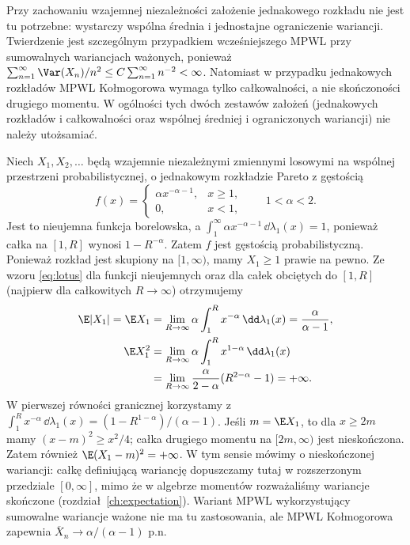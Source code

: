 \begin{uwaga}
Przy zachowaniu wzajemnej niezależności założenie
jednakowego rozkładu nie jest tu potrzebne: wystarczy
wspólna średnia i jednostajne ograniczenie wariancji.
Twierdzenie jest szczególnym przypadkiem wcześniejszego
MPWL przy sumowalnych wariancjach ważonych, ponieważ
$\sum_{n=1}^\infty\Var(X_n)/n^2
\leq C\sum_{n=1}^\infty n^{-2}<\infty$.
Natomiast w przypadku jednakowych rozkładów MPWL
Kołmogorowa wymaga tylko całkowalności, a nie
skończoności drugiego momentu. W ogólności tych dwóch
zestawów założeń (jednakowych rozkładów i całkowalności
oraz wspólnej średniej i ograniczonych wariancji)
nie należy utożsamiać.
\end{uwaga}

\begin{przyklad}
Niech $X_1,X_2,\ldots$ będą wzajemnie niezależnymi
zmiennymi losowymi na wspólnej przestrzeni
probabilistycznej, o jednakowym rozkładzie Pareto
z gęstością
\[
f(x)=
\begin{cases}
\alpha x^{-\alpha-1},&x\geq1,\\
0,&x<1,
\end{cases}
\qquad 1<\alpha<2.
\]
Jest to nieujemna funkcja borelowska, a
$\int_1^\infty\alpha x^{-\alpha-1}\,\dd\lambda_1(x)=1$,
ponieważ całka na $[1,R]$ wynosi $1-R^{-\alpha}$.
Zatem $f$ jest gęstością probabilistyczną.
Ponieważ rozkład jest skupiony na $[1,\infty)$,
mamy $X_1\geq1$ prawie na pewno. Ze wzoru
\eqref{eq:lotus} dla funkcji nieujemnych oraz
dla całek obciętych do $[1,R]$ (najpierw dla
całkowitych $R\to\infty$) otrzymujemy
\[
\begin{aligned}
\E|X_1|=\E X_1
&=\lim_{R\to\infty}\alpha\int_1^R x^{-\alpha}\,
\dd\lambda_1(x)=\frac{\alpha}{\alpha-1},\\
\E X_1^2
&=\lim_{R\to\infty}\alpha\int_1^R x^{1-\alpha}\,
\dd\lambda_1(x)\\
&=\lim_{R\to\infty}\frac{\alpha}{2-\alpha}
(R^{2-\alpha}-1)=+\infty.
\end{aligned}
\]
W pierwszej równości granicznej korzystamy z
$\int_1^R x^{-\alpha}\,\dd\lambda_1(x)
=(1-R^{1-\alpha})/(\alpha-1)$.
Jeśli $m=\E X_1$, to dla $x\geq 2m$ mamy
$(x-m)^2\geq x^2/4$; całka drugiego momentu na
$[2m,\infty)$ jest nieskończona. Zatem również
$\E(X_1-m)^2=+\infty$.
W tym sensie mówimy o nieskończonej wariancji:
całkę definiującą wariancję dopuszczamy tutaj
w rozszerzonym przedziale $[0,\infty]$, mimo że
w algebrze momentów rozważaliśmy wariancje skończone
(rozdział~\ref{ch:expectation}).
Wariant MPWL wykorzystujący sumowalne wariancje
ważone nie ma tu zastosowania, ale MPWL Kołmogorowa
zapewnia $\overline X_n\to\alpha/(\alpha-1)$ p.n.
\end{przyklad}

